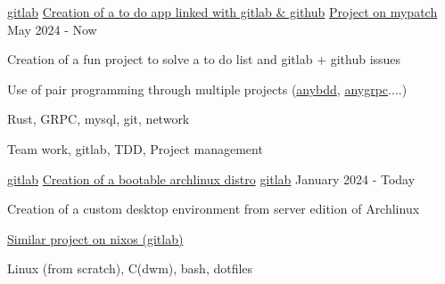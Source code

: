 

\begin{cventries}

	\cventry
	{\href{https://gitlab.com/patchme/any}{gitlab}} %
    {\href{https://gitlab.com/patchme/any}{Creation  of a to do app linked with gitlab \& github}} %
	{\href{https://mypatch.fr/projects/any}{Project on mypatch}} %
	{May 2024 - Now} %
	{
		\begin{cvitems} %
			\item {Creation of a fun project to solve a to do list and gitlab + github issues}
			\item {Use of pair programming through multiple projects (\href{https://gitlab.com/patchme/anybdd}{anybdd}, \href{https://gitlab.com/patchme/anygrpc}{anygrpc}....)}
		\end{cvitems}
	}
	{
		\begin{cvitemsskills} %
			\item {Rust, GRPC, mysql, git, network }
			\item {Team work, gitlab, TDD, Project management}
		\end{cvitemsskills}
	}

	\cventry
	{\href{https://gitlab.com/patchme/}{gitlab}} %
	{\href{https://gitlab.com/patchme/oh-my-arch}{Creation of a bootable archlinux distro}}
	{\href{https://gitlab.com/patchme/oh-my-arch}{gitlab}} %
	{January 2024 - Today} %
	{
		\begin{cvitems} %
			\item {Creation of a custom desktop environment from server edition of Archlinux}
			\item {\href{https://gitlab.com/patchme/any}{Similar project on nixos (gitlab)}}
		\end{cvitems}
	}
	{
		\begin{cvitemsskills} %
			\item {Linux (from scratch), C(dwm), bash, dotfiles}
		\end{cvitemsskills}
	}



\end{cventries}
